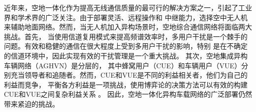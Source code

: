 近年来，空地一体化作为提高无线通信质量的最可行的解决方案之一，引起了工业界和学术界的广泛关注。由于部署灵活、远程操作和
中继能力，选择空中无人机来辅助地面网络\cite{ACO}。然而，当无人机加入异构场景时，空地综合通信网络将面临两大挑战。首先，
当使用信道复用模式来提高频谱效率时，多用户干扰是一个棘手的问题。有效和稳健的通信在很大程度上受到多用户干扰的影响，特别
是在不确定的信道环境中，因此实现有效的干扰管理是一个重大挑战\cite{CCO}。 其次，空地集成异构车辆网络（AGHVN）是分层的，
其中蜂窝用户（CUE）和车辆用户（VUE）分别充当领导者和追随者。然而，CUE和VUE是不同的利益相关者，他们为自己的利益而竞争，
平衡各方利益是一项挑战，使用博弈论的决策方法可以有效的构建CUE和VUE之间复杂利益关系 \cite{胡益恺智能车辆决策方法研究综述}。
因此，空地一体化异构车载网络的广泛部署仍然带来紧迫的挑战。

